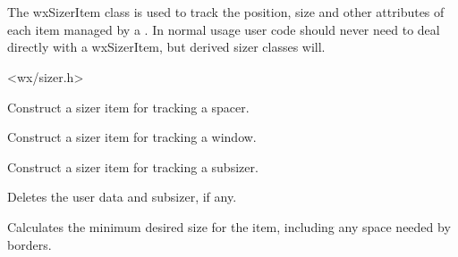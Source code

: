 
\section{}\label{wxsizeritem}

The wxSizerItem class is used to track the position, size and other
attributes of each item managed by a .  In
normal usage user code should never need to deal directly with a
wxSizerItem, but derived sizer classes will.





<wx/sizer.h>




\label{wxsizeritemwxsizeritem}


Construct a sizer item for tracking a spacer.




Construct a sizer item for tracking a window.




Construct a sizer item for tracking a subsizer.



\label{wxsizeritemdtor}


Deletes the user data and subsizer, if any.


\label{wxsizeritemcalcmin}


Calculates the minimum desired size for the item, including any space
needed by borders.



